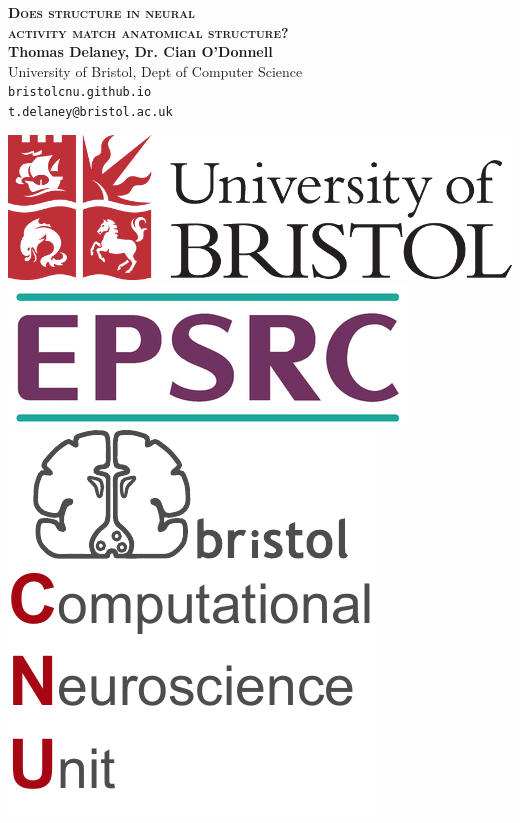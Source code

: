 \documentclass[a0,portrait]{a0poster}
\begin{document}

\begin{minipage}[b]{0.75\linewidth}
  \veryHuge \color{NavyBlue} \textbf{\textsc{Does structure in neural \\[0.3cm] activity match anatomical structure?}} \color{Black}\\[1cm] %
  \huge \textbf{Thomas Delaney, Dr. Cian O'Donnell}\\[0.3cm] %
  \huge University of Bristol, Dept of Computer Science\\[0.1cm] %
  \large \texttt{bristolcnu.github.io} \\
  \Large \texttt{t.delaney@bristol.ac.uk} \\
\end{minipage}
%
\begin{minipage}[b]{0.24\linewidth}
  \centering
  \includegraphics[width=0.475\linewidth]{bristol_university_logo.png} \vspace{0.3cm}\\
  \includegraphics[width=0.475\linewidth]{epsrc_logo.png} \\
  \includegraphics[width=0.475\linewidth]{BCNU_logo.pdf}
\end{minipage}
\end{document}
